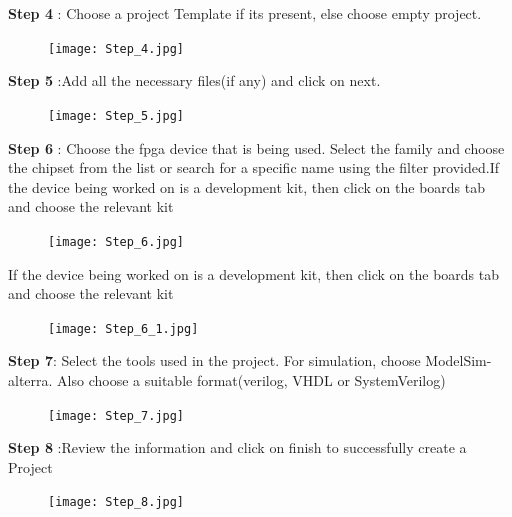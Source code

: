 \documentclass[12pt,singleside,a4paper]{article}
\begin{document}
\noindent \textbf{Step 4} : Choose a project Template if its present, else choose empty project.
\begin{figure}[H]
\centering
\texttt{[image: Step\_4.jpg]}
\end{figure}

\noindent \textbf{Step 5} :Add all the necessary files(if any) and click on next.
\begin{figure}[H]
\centering
\texttt{[image: Step\_5.jpg]}
\end{figure}

\noindent \textbf{Step 6} : Choose the fpga device that is being used. Select the family and choose the chipset \hspace*{39pt} from the list or search for a specific name using the filter provided.If the device being \hspace*{39pt} worked on is a development kit, then click on the boards tab and choose the relevant \hspace*{39pt} kit
\begin{figure}[H]
\centering
\texttt{[image: Step\_6.jpg]}
\end{figure}

\noindent If the device being  worked on is a development kit, then click on the boards tab and choose the relevant kit
\begin{figure}[H]
\centering
\texttt{[image: Step\_6\_1.jpg]}
\end{figure}

\noindent \textbf{Step 7}: Select the tools used in the project. For simulation, choose ModelSim-alterra. Also \hspace*{39pt} choose a suitable format(verilog, VHDL or SystemVerilog)
\begin{figure}[H]
\centering
\texttt{[image: Step\_7.jpg]}
\end{figure}

\noindent \textbf{Step 8} :Review the information and click on finish to successfully create a Project
\begin{figure}[H]
\centering
\texttt{[image: Step\_8.jpg]}
\end{figure}

\newpage
\end{document}
